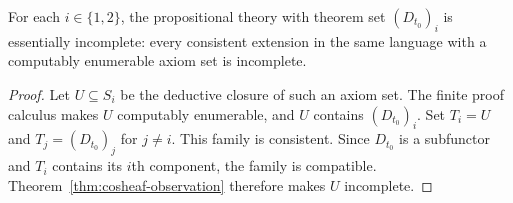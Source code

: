 \begin{corollary}\label{cor:cosheaf-essential-incompleteness}
For each $i\in\{1,2\}$, the propositional theory with theorem set
$(D_{t_0})_i$ is essentially incomplete: every consistent extension in
the same language with a computably enumerable axiom set is incomplete.
\end{corollary}
\begin{proof}
Let $U\subseteq S_i$ be the deductive closure of such an axiom set.
The finite proof calculus makes $U$ computably enumerable, and
$U$ contains $(D_{t_0})_i$.
Set $T_i=U$ and $T_j=(D_{t_0})_j$ for $j\ne i$.
This family is consistent. Since $D_{t_0}$ is a subfunctor and
$T_i$ contains its $i$th component, the family is compatible.
Theorem~\ref{thm:cosheaf-observation} therefore makes $U$ incomplete.
\end{proof}
